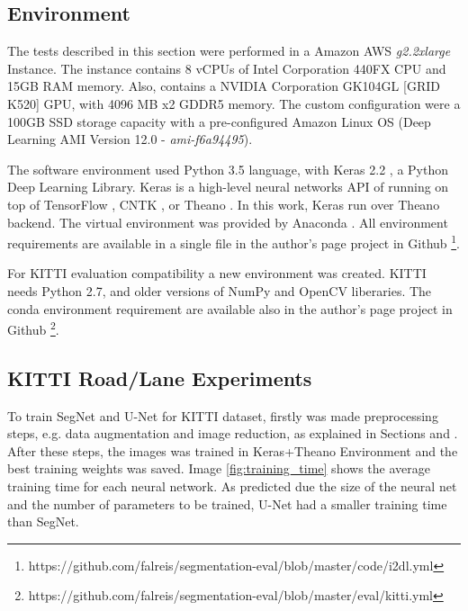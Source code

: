 \documentclass[10pt,twocolumn,letterpaper]{article}
\begin{document}
\subsection{Environment} \label{ssec:environment}

The tests described in this section were performed in a Amazon AWS \cite{AMAZON_WEBSITE} \textit{g2.2xlarge} Instance. The instance contains 8 vCPUs of Intel Corporation 440FX CPU and 15GB RAM memory. Also, contains a NVIDIA Corporation GK104GL [GRID K520] GPU, with 4096 MB x2 GDDR5 memory. The custom configuration were a 100GB SSD storage capacity with a pre-configured Amazon Linux OS (Deep Learning AMI Version 12.0 - \textit{ami-f6a94495}).

The software environment used Python 3.5 \cite{PYTHON_WEBSITE} language, with Keras 2.2 \cite{KERAS}, a Python Deep Learning Library. Keras is a high-level neural networks API of running on top of TensorFlow \cite{TENSORFLOW}, CNTK \cite{CNTK}, or Theano \cite{THEANO} \cite{KERAS}. In this work, Keras run over Theano \cite{THEANO} backend. The virtual environment was provided by Anaconda \cite{ANACONDA_WEBSITE}. All environment requirements are available in a single file in the author's page project in Github \footnote{https://github.com/falreis/segmentation-eval/blob/master/code/i2dl.yml}.

For KITTI evaluation compatibility a new environment was created. KITTI needs Python 2.7, and older versions of NumPy and OpenCV liberaries. The conda environment requirement are available also in the author's page project in Github \footnote{https://github.com/falreis/segmentation-eval/blob/master/eval/kitti.yml}.

\subsection{KITTI Road/Lane Experiments} \label{ssec:kitti_experiments}

To train SegNet and U-Net for KITTI dataset, firstly was made preprocessing steps, e.g. data augmentation and image reduction, as explained in Sections \label{ssec:data_augmentation} and \label{ssec:image_reduction}. After these steps, the images was trained in Keras+Theano Environment and the best training weights was saved. Image \ref{fig:training_time} shows the average training time for each neural network. As predicted due the size of the neural net and the number of parameters to be trained, U-Net had a smaller training time than SegNet.
\end{document}
